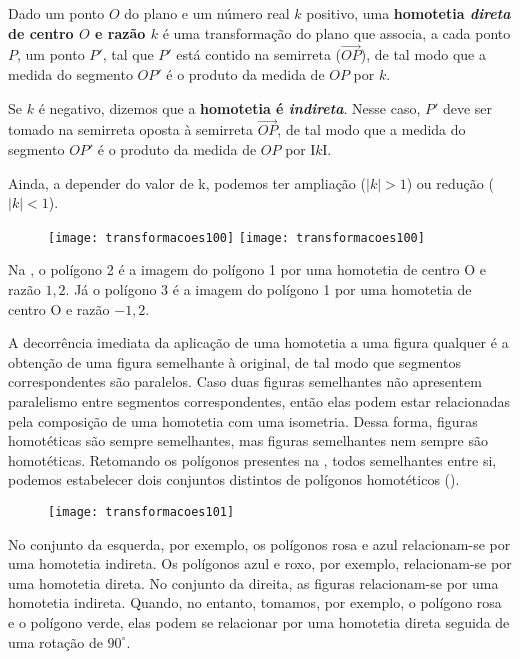 Dado um ponto $O$ do plano e um número real $k$ positivo, uma \textbf{homotetia \textit{direta} de centro $O$ e razão $k$} é uma transformação do plano que associa, a cada ponto $P$, um ponto $P'$, tal que $P'$ está contido na semirreta ($\overrightarrow{OP}$), de tal modo que a medida do segmento $OP'$ é o produto da medida de $OP$ por $k$. 

Se $k$ é negativo, dizemos que a \textbf{homotetia é \textit{indireta}}. Nesse caso, $P'$ deve ser tomado na semirreta oposta à semirreta $\overrightarrow{OP}$, de tal modo que a medida do segmento $OP'$ é o produto da medida de $OP$ por $ӀkӀ$. 

Ainda, a depender do valor de k, podemos ter ampliação ($|k|>1$) ou redução ($|k|<1$). 

\begin{figure}[H]
\centering

\ifnum{}
\texttt{[image: transformacoes100]}
\else
\texttt{[image: transformacoes100]}
\fi
\caption{}
\label{transformacoes100}
\end{figure}
 
Na , o polígono 2 é a imagem do polígono 1 por uma homotetia de centro O e razão $1{,}2$. Já o polígono 3 é a imagem do polígono 1 por uma homotetia de centro O e razão $-1{,}2$. 


A decorrência imediata da aplicação de uma homotetia a uma figura qualquer é a obtenção de uma figura semelhante à original, de tal modo que segmentos correspondentes são paralelos. Caso duas figuras semelhantes não apresentem paralelismo entre segmentos correspondentes, então elas podem estar relacionadas pela composição de uma homotetia com uma isometria.
Dessa forma, figuras homotéticas são sempre semelhantes, mas figuras semelhantes nem sempre são homotéticas. Retomando os polígonos presentes na , todos semelhantes entre si, podemos estabelecer dois conjuntos distintos de polígonos homotéticos (). 

\begin{figure}[H]
\centering

\texttt{[image: transformacoes101]}
\caption{}
\label{transformacoes101}
\end{figure}
 
No conjunto da esquerda, por exemplo, os polígonos rosa e azul relacionam-se por uma homotetia indireta. Os polígonos azul e roxo, por exemplo, relacionam-se por uma homotetia direta. No conjunto da direita, as figuras relacionam-se por uma homotetia indireta. Quando, no entanto, tomamos, por exemplo, o polígono rosa e o polígono verde, elas podem se relacionar por uma homotetia direta seguida de uma rotação de $90^{\circ}$. 


